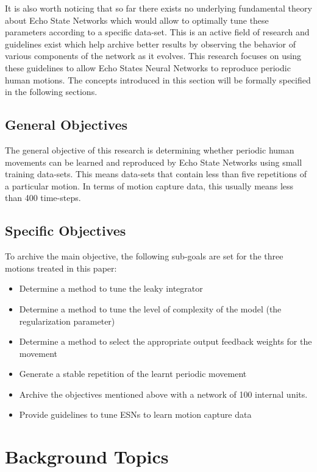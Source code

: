 \documentclass[letterpaper,9pt]{article}
\begin{document}
It is also worth noticing that so far there exists no underlying fundamental theory about Echo State Networks which would allow to optimally tune these parameters according to a specific data-set. This is an active field of research and guidelines exist which help archive better results by observing the behavior of various components of the network as it evolves. This research focuses on using these guidelines to allow Echo States Neural Networks to reproduce periodic human motions. The concepts introduced in this section will be formally specified in the following sections.

\subsection{General Objectives}

The general objective of this research is determining whether periodic human movements can be learned and reproduced by Echo State Networks using small training data-sets. This means data-sets that contain less than five repetitions of a particular motion. In terms of motion capture data, this usually means less than 400 time-steps.

\subsection{Specific Objectives}

To archive the main objective, the following sub-goals are set for the three motions treated in this paper:

\begin{itemize}
  \item Determine a method to tune the leaky integrator
  \item Determine a method to tune the level of complexity of the model (the regularization parameter)
  \item Determine a method to select the appropriate output feedback weights for the movement
  \item Generate a stable repetition of the learnt periodic movement
  \item Archive the objectives mentioned above with a network of 100 internal units.
  \item Provide guidelines to tune ESNs to learn motion capture data
\end{itemize}

\section{Background Topics}
\end{document}
